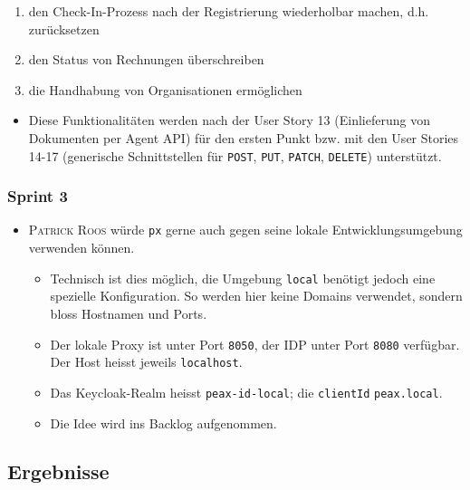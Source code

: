\begin{itemize}
\begin{enumerate}
            \item den Check-In-Prozess nach der Registrierung wiederholbar machen, d.h. zurücksetzen
            \item den Status von Rechnungen überschreiben
            \item die Handhabung von Organisationen ermöglichen
        \end{enumerate}
        \begin{itemize}
            \item Diese Funktionalitäten werden nach der User Story 13 (Einlieferung von Dokumenten per Agent API) für den ersten Punkt bzw. mit den User Stories 14-17 (generische Schnittstellen für \texttt{POST}, \texttt{PUT}, \texttt{PATCH}, \texttt{DELETE}) unterstützt.
        \end{itemize}
\end{itemize}

\subsubsection{Sprint 3}

\begin{itemize}
    \item \textsc{Patrick Roos} würde \texttt{px} gerne auch gegen seine lokale Entwicklungsumgebung verwenden können.
        \begin{itemize}
            \item Technisch ist dies möglich, die Umgebung \texttt{local} benötigt jedoch eine spezielle Konfiguration. So werden hier keine Domains verwendet, sondern bloss Hostnamen und Ports.
            \item Der lokale Proxy ist unter Port \texttt{8050}, der IDP unter Port \texttt{8080} verfügbar. Der Host heisst jeweils \texttt{localhost}.
            \item Das Keycloak-Realm heisst \texttt{peax-id-local}; die \texttt{clientId} \texttt{peax.local}.
            \item Die Idee wird ins Backlog aufgenommen.
        \end{itemize}
\end{itemize}

\subsection{Ergebnisse}

